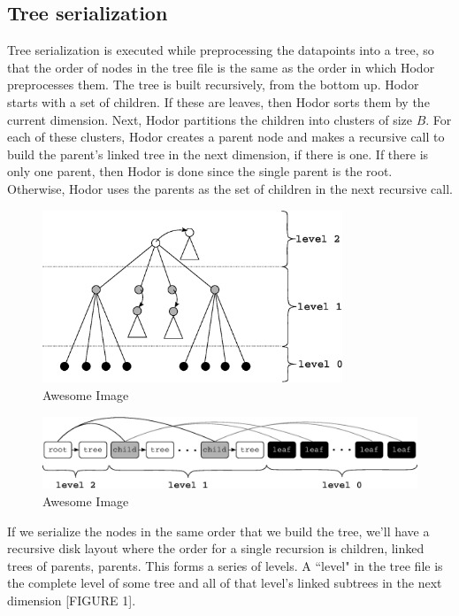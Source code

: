 \documentclass[11pt, oneside]{article}
\begin{document}
\subsection{Tree serialization}


Tree serialization is executed while preprocessing the datapoints into a tree,
so that the order of nodes in the tree file is the same as the order in which
Hodor preprocesses them. The tree is built recursively, from the bottom up.
Hodor starts with a set of children. If these are leaves, then Hodor sorts them
by the current dimension. Next, Hodor partitions the children into clusters of
size $B$. For each of these clusters, Hodor creates a parent node and makes a
recursive call to build the parent's linked tree in the next dimension, if
there is one. If there is only one parent, then Hodor is done since the single
parent is the root.  Otherwise, Hodor uses the parents as the set of children
in the next recursive call. 

\begin{figure}[p]
    \centering
    \includegraphics[width=0.8\textwidth]{fig1.eps}
    \caption{Awesome Image}
\end{figure}
\begin{figure}[p]
    \centering
    \includegraphics[width=1\textwidth]{fig2.eps}
    \caption{Awesome Image}
\end{figure}

If we serialize the nodes in the same order that we build the tree, we'll have
a recursive disk layout where the order for a single recursion is children,
linked trees of parents, parents. This forms a series of levels. A ``level" in
the tree file is the complete level of some tree and all of that level's linked
subtrees in the next dimension [FIGURE 1]. 
\end{document}
